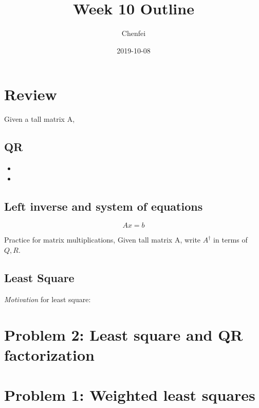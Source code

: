 \documentclass[11pt]{article}
\author{Chenfei}
\date{2019-10-08}
\title{Week 10 Outline}
\begin{document}
\maketitle
\section{Review}
\label{sec:orgcea67ea}
Given a tall matrix A,
\subsection{QR}
\label{sec:org3b824e7}
\begin{itemize} 
\item
\item
\end{itemize}
\subsection{Left inverse and system of equations}
\label{sec:orgccc8463}
\begin{equation}
Ax = b 
\end{equation}

Practice for matrix multiplications,
Given tall matrix A, write $A^{\dagger}$ in terms of $Q,R$.

\begin{center} 
\framebox[\textwidth]{\rule{0pt}{200pt}}
\end{center}


\subsection{Least Square}
\label{sec:orgefee99a}
\emph{Motivation} for least square: 
  \begin{center}
  \framebox[\textwidth]{\rule{0pt}{200pt}}
  \end{center}


\section{Problem 2: Least square and QR factorization}
\label{sec:org46f4603}
\begin{center}
\centering \framebox[\textwidth]{\rule{0pt}{240pt}}
\end{center}
\newpage 

\section{Problem 1: Weighted least squares}
\label{sec:orgc322fa7}
\begin{center}
\framebox[\textwidth]{\rule{0pt}{400pt}}
\end{center}
\newpage
\end{document}
